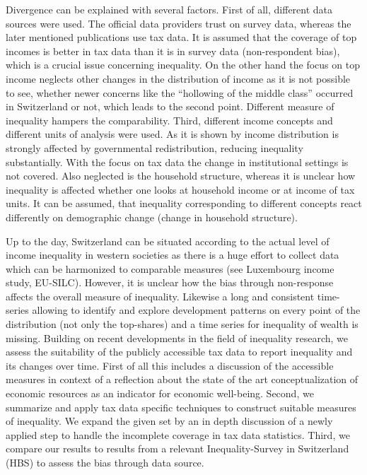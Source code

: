 Divergence can be explained with several factors. First of all, different data sources were used. The official data providers trust on survey data, whereas the later mentioned publications use tax data. It is assumed that the coverage of top incomes is better in tax data than it is in survey data (non-respondent bias), which is a crucial issue concerning inequality. On the other hand the focus on top income neglects other changes in the distribution of income as it is not possible to see, whether newer concerns like the ``hollowing of the middle class'' occurred in Switzerland or not, which leads to the second point. Different measure of inequality hampers the comparability. Third, different income concepts and different units of analysis were used. As it is shown by \citet{modetta_einkommensungleichheit_2012} income distribution is strongly affected by governmental redistribution, reducing inequality substantially. With the focus on tax data the change in institutional settings is not covered. Also neglected is the household structure, whereas it is unclear how inequality is affected whether one looks at household income or at income of tax units. It can be assumed, that inequality corresponding to different concepts react differently on demographic change (change in household structure). 







Up to the day, Switzerland can be situated according to the actual level of income inequality in western societies as there is a huge effort to collect data which can be harmonized to comparable measures (see Luxembourg income study, EU-SILC). However, it is unclear how the bias through non-response affects the overall measure of inequality. Likewise a long and consistent time-series allowing to identify and explore development patterns on every point of the distribution (not only the top-shares) and a time series for inequality of wealth is missing. Building on recent developments in the field of inequality research, we assess the suitability of the publicly accessible tax data to report inequality and its changes over time. First of all this includes a discussion of the accessible measures in context of a reflection about the state of the art conceptualization of economic resources as an indicator for economic well-being. Second, we summarize and apply tax data specific techniques to construct suitable measures of inequality. We expand the given set by an in depth discussion of a newly applied step to handle the incomplete coverage in tax data statistics. Third, we compare our results to results from a relevant Inequality-Survey in Switzerland (HBS) to assess the bias through data source.

